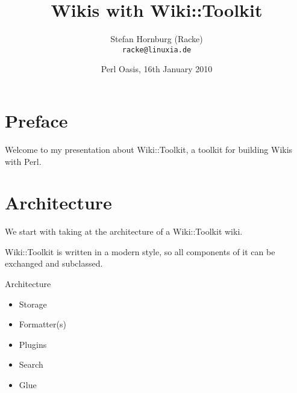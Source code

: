 
\usepackage[T1]{fontenc}
\usepackage{mathptmx}
\usepackage[scaled=.90]{helvet}
\usepackage{courier}

\usepackage{beamerthemesplit}
\usepackage{verbatim}
\usepackage{hyperref}
\usepackage{listings}
\lstset{language=Perl,basicstyle=\footnotesize,tabsize=3}


\title{Wikis with Wiki::Toolkit}
\author[racke]{Stefan Hornburg (Racke)\\ \texttt{racke@linuxia.de}}
\date[OPW2010]{Perl Oasis, 16th January 2010}



\begin{frame}
  \titlepage
\end{frame}

\tableofcontents

\section{Preface}
Welcome to my presentation about Wiki::Toolkit, a toolkit for building
Wikis with Perl.

 

\section{Architecture}


We start with taking at the architecture of a Wiki::Toolkit wiki.

Wiki::Toolkit is written in a modern style, so all components of
it can be exchanged and subclassed.

\begin{frame}{Architecture}
 \begin{itemize}
  \item Storage
  \item Formatter(s)
  \item Plugins
  \item Search
  \item Glue
 \end{itemize}
\end{frame}

